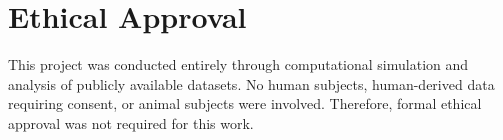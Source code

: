\chapter{Ethical Approval}
\label{app:ethics}


This project was conducted entirely through computational simulation and analysis of publicly available datasets. No human subjects, human-derived data requiring consent, or animal subjects were involved. Therefore, formal ethical approval was not required for this work.
